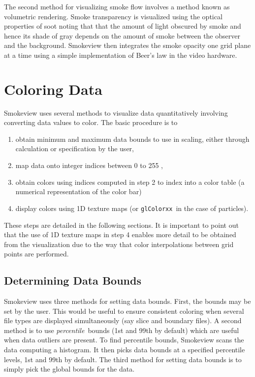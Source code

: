 \documentclass[11pt,twoside]{book}
\begin{document}
The second method for visualizing smoke flow involves a method
known as volumetric rendering.  Smoke transparency is visualized
using the optical properties of soot noting that that the amount
of light obscured by smoke and hence its shade of gray depends on
the amount of smoke between the observer and the background.
Smokeview then integrates the smoke opacity one grid plane at a
time using a simple implementation of Beer's law in the video
hardware.



%
%

\section{Coloring Data}
Smokeview uses several methods to visualize data quantitatively
involving converting data values to color. The basic procedure is
to
\begin{enumerate}
\item obtain minimum and maximum data bounds to use in scaling, either through calculation or specification by the user,
\item map data onto integer indices between 0 to 255 ,
\item obtain colors using indices computed in step 2 to index into a color table (a numerical representation of the color bar)
\item display colors using 1D texture maps (or {\tt glColorxx}\ in the case of particles).
\end{enumerate}
These steps are detailed in the following sections.   It is important to point out that the use of 1D texture maps in step 4 enables more detail to be obtained from the visualization due to the way that color interpolations between grid points are performed.

\subsection{Determining Data Bounds}Smokeview uses three methods for setting data bounds.  First, the bounds may be set by the user.  This would be useful to ensure consistent coloring when several file types are displayed simultaneously (say slice and boundary files).  A second method is to use {\em percentile}\ bounds (1st and 99th by default) which are useful when data outliers are present.  To find percentile bounds, Smokeview scans the data computing a histogram.  It then picks data bounds at a specified percentile levels, 1st and 99th by default.  The third method for setting data bounds is to simply pick the global bounds for the data.
\end{document}
